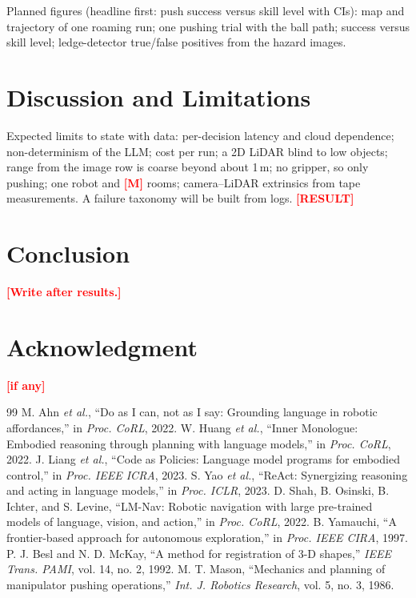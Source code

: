 \documentclass[conference]{IEEEtran}
\newcommand{\todo}[1]{\textcolor{red}{\textbf{[#1]}}}
\begin{document}
\noindent Planned figures (headline first: push success versus skill level with CIs): map and trajectory of one roaming run; one pushing trial with the ball path; success versus skill level; ledge-detector true/false positives from the hazard images.

\section{Discussion and Limitations}
Expected limits to state with data: per-decision latency and cloud dependence; non-determinism of the LLM; cost per run; a 2D LiDAR blind to low objects;
range from the image row is coarse beyond about 1\,m; no gripper, so only pushing; one robot and \todo{M} rooms; camera--LiDAR extrinsics from tape measurements.
A failure taxonomy will be built from logs. \todo{RESULT}

\section{Conclusion}
\todo{Write after results.}

\section*{Acknowledgment}
\todo{if any}

\begin{thebibliography}{99}
 M. Ahn \emph{et al.}, ``Do as I can, not as I say: Grounding language in robotic affordances,'' in \emph{Proc. CoRL}, 2022.
 W. Huang \emph{et al.}, ``Inner Monologue: Embodied reasoning through planning with language models,'' in \emph{Proc. CoRL}, 2022.
 J. Liang \emph{et al.}, ``Code as Policies: Language model programs for embodied control,'' in \emph{Proc. IEEE ICRA}, 2023.
 S. Yao \emph{et al.}, ``ReAct: Synergizing reasoning and acting in language models,'' in \emph{Proc. ICLR}, 2023.
 D. Shah, B. Osinski, B. Ichter, and S. Levine, ``LM-Nav: Robotic navigation with large pre-trained models of language, vision, and action,'' in \emph{Proc. CoRL}, 2022.
 B. Yamauchi, ``A frontier-based approach for autonomous exploration,'' in \emph{Proc. IEEE CIRA}, 1997.
 P. J. Besl and N. D. McKay, ``A method for registration of 3-D shapes,'' \emph{IEEE Trans. PAMI}, vol. 14, no. 2, 1992.
 M. T. Mason, ``Mechanics and planning of manipulator pushing operations,'' \emph{Int. J. Robotics Research}, vol. 5, no. 3, 1986.
\end{thebibliography}
\end{document}
